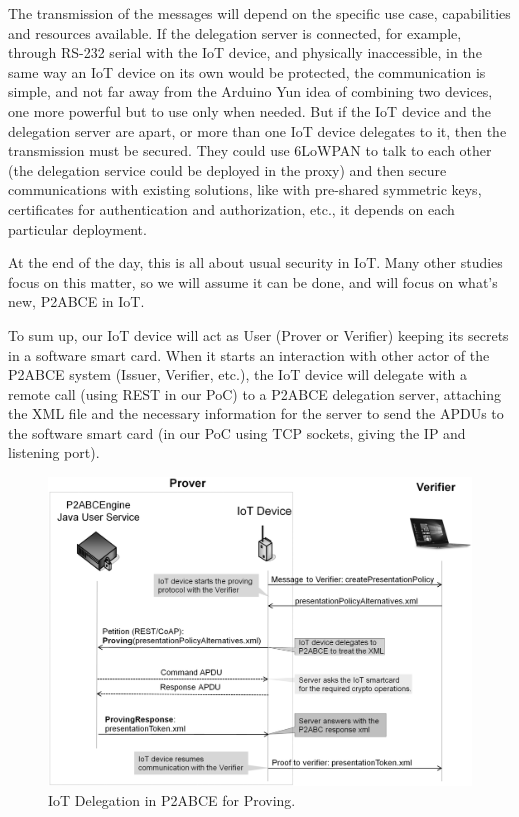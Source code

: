 The transmission of the messages will depend on the specific use case, capabilities and resources available. If the delegation server is connected, for example, through RS-232 serial with the IoT device, and physically inaccessible, in the same way an IoT device on its own would be protected, the communication is simple, and not far away from the Arduino Yun idea of combining two devices, one more powerful but to use only when needed. But if the IoT device and the delegation server are apart, or more than one IoT device delegates to it, then the transmission must be secured. They could use 6LoWPAN to talk to each other (the delegation service could be deployed in the proxy) and then secure communications with existing solutions, like with pre-shared symmetric keys, certificates for authentication and authorization, etc., it depends on each particular deployment.

At the end of the day, this is all about usual security in IoT. Many other studies focus on this matter, so we will assume it can be done, and will focus on what's new, P2ABCE in IoT.


\hfil




To sum up, our IoT device will act as User (Prover or Verifier) keeping its secrets in a software smart card. When it starts an interaction with other actor of the P2ABCE system (Issuer, Verifier, etc.), the IoT device will delegate with a remote call (using REST in our PoC) to a P2ABCE delegation server, attaching the XML file and the necessary information for the server to send the APDUs to the software smart card (in our PoC using TCP sockets, giving the IP and listening port).



\begin{figure}[bth]
	\begin{center}
		\includegraphics[width=\linewidth]{gfx/DelegationProving}
	\end{center}
	\caption{IoT Delegation in P2ABCE for Proving.}
	\label{fig:DelegationProving}
\end{figure}



